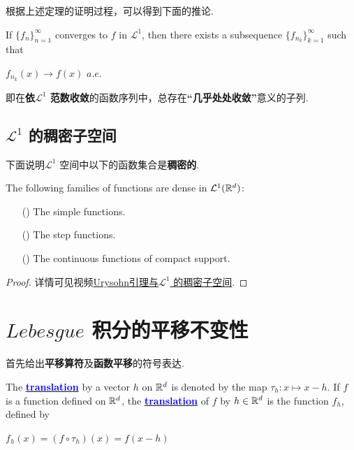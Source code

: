 	\vspace{2em}
	根据上述定理的证明过程，可以得到下面的推论.
	\begin{corollary}\label{cor 3.2.2}
		If $\{ f_n \}_{n = 1}^{\infty}$ converges to $f$ in $\mathcal{L}^1$, then there exists a subsequence $\{ f_{n_k} \}_{k = 1}^{\infty}$ such that
		\begin{center}
			$f_{n_k}(x) \to f(x) \,\, a.e.$
		\end{center}
	
		\vspace{1em}
		\begin{rmk}
			即在\textbf{依$\mathcal{L}^1$ 范数收敛}的函数序列中，总存在\textbf{“几乎处处收敛”}意义的子列.
		\end{rmk}
	\end{corollary}

\vspace{2em}
\subsection{$\mathcal{L}^1$ 的稠密子空间}
	下面说明$\mathcal{L}^1$ 空间中以下的函数集合是\textbf{稠密的}.
	\begin{thm}\label{thm 3.2.3}
		The following families of functions are dense in $\mathcal{L}^{1}(\mathbb{R}^d)$:
		\begin{enumerate}
			\item[(\rmnum{1})]The simple functions.
			
			\item[(\rmnum{2})]The step functions.
			
			\item[(\rmnum{3})]The continuous functions of compact support.
		\end{enumerate}
	
		\vspace{2em}
		\begin{proof}
			详情可见视频\href{https://www.bilibili.com/video/BV1FT411C7wM?p=24}{Urysohn引理与$\mathcal{L}^1$ 的稠密子空间}.
		\end{proof}
	\end{thm}

\newpage
\section{$Lebesgue$ 积分的平移不变性}
	首先给出\textbf{平移算符}及\textbf{函数平移}的符号表达.
	\begin{defn}\label{def 3.3.1}
		The \underline{\textcolor{blue}{\textbf{translation}}} by a vector $h$ on $\mathbb{R}^d$ is denoted by the map $\tau_h : x \mapsto x - h$. If $f$ is a function defined on $\mathbb{R}^d$, the \underline{\textcolor{blue}{\textbf{translation}}} of $f$ by $h \in \mathbb{R}^d$ is the function $f_h$, defined by
		\begin{center}
			$f_{h}(x) = (f \circ \tau_h)(x) = f(x - h)$
		\end{center}
	\end{defn}


